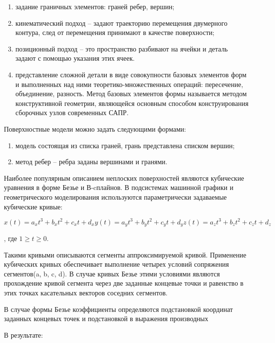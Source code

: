 \documentclass[unicode, 12pt, a4paper, oneside]{article}
\begin{document}
\begin{enumerate}
\item задание граничных элементов: граней ребер, вершин;
\item кинематический подход – задают траекторию перемещения двумерного контура, след от перемещения принимают в качестве поверхности;
\item позиционный подход – это пространство разбивают на ячейки и деталь задают с помощью указания этих ячеек.
\item представление сложной детали в виде совокупности базовых элементов форм и выполненных над ними теоретико-множественных операций: пересечение, объединение, разность. Метод базовых элементов формы называется методом конструктивной геометрии, являющейся основным способом конструирования сборочных узлов современных САПР.
\end{enumerate}

Поверхностные модели можно задать следующими формами:

\begin{enumerate}
\item модель состоящая из списка граней, грань представлена списком вершин;
\item метод ребер – ребра заданы вершинами и гранями.
\end{enumerate}

Наиболее популярным описанием неплоских поверхностей являются кубические уравнения в форме Безье и В-cплайнов.
В подсистемах машинной графики и геометрического моделирования используются параметрически задаваемые кубические кривые:

\begin{equation}
x(t)=a_x t^3 + b_x t^2 + c_x t + d_x
y(t)=a_y t^3 + b_y t^2 + c_y t + d_y
z(t)=a_z t^3 + b_z t^2 + c_z t + d_z
\end{equation}

, где $1\geq t\geq 0$.

Такими кривыми описываются сегменты аппроксимируемой кривой. Применение кубических кривых обеспечивает выполнение четырех условий сопряжения сегментов(a, b, c, d). В случае кривых Безье этими условиями являются прохождение кривой сегмента через две заданные концевые точки и равенство в этих точках касательных векторов соседних сегментов.

В случае формы Безье коэффициенты определяются подстановкой координат заданных концевых точек и подстановкой в выражения производных

В результате:
 
\end{document}
